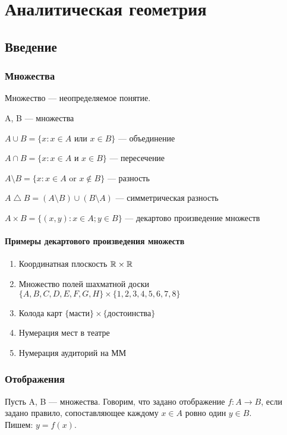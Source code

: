 \documentclass[main]{subfiles}
\begin{document}
\part{Аналитическая геометрия}
\chapter{Введение}
\section{Множества}
\begin{definition}
    Множество --- неопределяемое понятие.
\end{definition}

A, B --- множества

$A \cup B = \{x:x \in A \text{ или } x \in B\}$ --- объединение

$A \cap B = \{x:x \in A \text{ и } x \in B\}$ --- пересечение

$A\setminus B = \{x:x \in A \text{ or } x \not\in B\}$ --- разность

$A \bigtriangleup B = (A \setminus B) \cup (B \setminus A)$ --- симметрическая разность

$A \times B = \{(x,y):x \in A; y \in B\}$ --- декартово произведение множеств

\subsection{Примеры декартового произведения множеств}

\begin{enumerate}
    \item Координатная плоскость $\mathbb{R} \times \mathbb{R}$
    \item Множество полей шахматной доски $\{A,B,C,D,E,F,G,H\}\times \{1,2,3,4,5,6,7,8\}$
    \item Колода карт $\{\text{масти}\} \times \{\text{достоинства}\}$
    \item Нумерация мест в театре
    \item Нумерация аудиторий на ММ
\end{enumerate}

\section{Отображения}
\begin{definition}
    Пусть A, B --- множества.
    Говорим, что задано отображение $f: A \to B$,
    если задано правило, сопоставляющее каждому $x \in A$ ровно один $y \in B$.\\
    Пишем: $y = f(x)$.
\end{definition}
\end{document}
